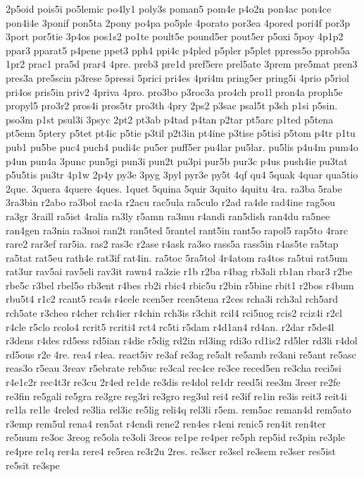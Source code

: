 {2p5oid
pois5i
po5lemic
po4ly1
poly3s
poman5
pom4e
p4o2n
pon4ac
pon4ce
pon4i4e
3ponif
pon5ta
2pony
po4pa
po5ple
4porato
por3ea
4pored
pori4f
por3p
3port
por5tie
3p4os
pos1s2
po1te
poult5e
pound5er
pout5er
p5oxi
5poy
4p1p2
ppar3
pparat5
p4pene
ppet3
pph4
ppi4c
p4pled
p5pler
p5plet
ppress5o
pprob5a
1pr2
prac1
pra5d
prar4
4pre.
preb3
pre1d
pref5ere
prel5ate
3prem
pre5mat
pren3
pres3a
pre5scin
p3rese
5pressi
5prici
pri4es
4pri4m
pring5er
pring5i
4prio
p5riol
pri4os
pris5in
priv2
4priva
4pro.
pro3bo
p3roc3a
pro4ch
pro1l
pron4a
proph5e
propyl5
pro3r2
pros4i
pros5tr
pro3th
4pry
2ps2
p3sac
psal5t
p3sh
p1si
p5sin.
pso3m
p1st
psul3i
3psyc
2pt2
pt3ab
p4tad
p4tan
p2tar
pt5arc
p1ted
p5tena
pt5enn
5ptery
p5tet
pt4ic
p5tie
p3til
p2t3in
pt4ine
p3tise
p5tisi
p5tom
p4tr
p1tu
pub1
pu5be
puc4
puch4
pudi4c
pu5er
puff5er
pu4lar
pu5lar.
pu5lis
p4u4m
pum4o
p4un
pun4a
3punc
pun5gi
pun3i
pun2t
pu3pi
pur5b
pur3c
p4us
push4ie
pu3tat
p5u5tis
pu3tr
4p1w
2p4y
py3e
3pyg
3pyl
pyr3e
py5t
4qf
qu4
5quak
4quar
qua5tio
2que.
3quera
4quere
4ques.
1quet
5quina
5quir
3quito
4quitu
4ra.
ra3ba
5rabe
3ra3bin
r2abo
ra3bol
rac4a
r2acu
rac5ula
ra5culo
r2ad
ra4de
rad4ine
rag5ou
ra3gr
3raill
ra5ist
4ralia
ra3ly
r5amn
ra3mu
r4andi
ran5dish
ran4du
ra5nee
ran4gen
ra3nia
ra3noi
ran2t
ran5ted
5rantel
rant5in
rant5o
rapol5
rap5to
4rarc
rare2
rar3ef
rar5ia.
ras2
ras3c
r2ase
r4ask
ra3so
rass5a
rass5in
r4as5te
ra5tap
ra5tat
rat5eu
rath4e
rat3if
rat4in.
ra5toc
5ra5tol
4r4atom
ra4tos
ra5tui
rat5um
rat3ur
rav5ai
rav5eli
rav3it
rawn4
ra3zie
r1b
r2ba
r4bag
rb3ali
rb1an
rbar3
r2be
rbe5c
r3bel
rbel5o
rb3ent
r4bes
rb2i
rbic4
rbic5u
r2bin
r5bine
rbit1
r2bos
r4bum
rbu5t4
r1c2
rcant5
rca4s
r4cele
rcen5er
rcen5tena
r2ces
rcha3i
rch3al
rch5ard
rch5ate
r3cheo
r4cher
rch4ier
r4chin
rch3is
r3chit
rcil4
rci5nog
rcis2
rciz4i
r2cl
r4cle
r5clo
rcolo4
rcrit5
rcriti4
rct4
rc5ti
r5dam
r4d1an4
rd4an.
r2dar
r5de4l
r3dens
r4des
rd5ess
rd5ian
r4die
r5dig
rd2in
rd3ing
rdi3o
rd1is2
rd5ler
rd3li
r4dol
rd5ous
r2e
4re.
rea4
r4ea.
react5iv
re3af
re3ag
re5alt
re5amb
re3ani
re5ant
re5asc
reas3o
r5eau
3reav
r5ebrate
reb5uc
re3cal
rec4ce
re3ce
reced5en
re3cha
reci5si
r4e1c2r
rec4t3r
re3cu
2r4ed
re1de
re3dis
re4dol
re1dr
reed5i
ree3m
3reer
re2fe
re3fin
re5gali
re5gra
re3gre
reg3ri
re3gro
reg3ul
rei4
re3if
re1in
re3is
reit3
reit4i
re1la
re1le
4reled
re3lia
rel3ic
re5lig
reli4q
rel3li
r5em.
rem5ac
reman4d
rem5ato
r3emp
rem5ul
rena4
ren5at
r4endi
rene2
ren4es
r4eni
renic5
ren4it
ren4ter
re5num
re3oc
3reog
re5ola
re3oli
3reos
re1pe
re4per
re5ph
rep5id
re3pin
re3ple
re4pre
re1q
rer4a
rere4
re5rea
re3r2u
2res.
re3scr
re3sel
re3sem
re3ser
res5ist
re5sit
re3spe
}
